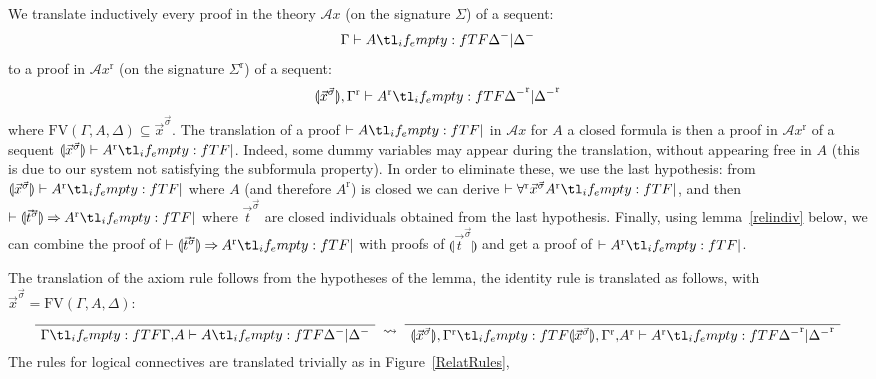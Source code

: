 \documentclass{CSML}
\newcommand*\ifpresent[3]{\tl_if_empty:fTF{#1}{#3}{#2}}
\newcommand*\AXM[1]{\AxiomC{$#1$}}
\newcommand*\UIM[1]{\UnaryInfC{$#1$}}
\newcommand*\DP\DisplayProof
\newcommand*\Entails{\mathrel{\vdash}}
\newcommand*\BarSep{\mathrel{|}}
\newcommand*\Sequent[3]{#1\Entails#2\ifpresent{#3}{\BarSep}{}#3}
\newcommand*\FV[1]{\text{FV}\left(#1\right)}
\newcommand*\SortA{\sigma}
\newcommand*\LogSortedTerm[2]{#1^{#2}}
\newcommand*\LogTermA{t}
\newcommand*\LogVarA{x}
\newcommand*\LogNeg[1]{{#1^-}}
\newcommand*\LogImp{\mathbin{\Rightarrow}}
\newcommand*\LogRel[1]{\llparenthesis#1\rrparenthesis}
\newcommand*\LogRelForm[1]{{#1^\mathrm{r}}}
\newcommand*\LogForallRel{\forall^\mathrm{r}}
\newcommand*\LogFormA{A}
\newcommand*\LogAxioms{\mathcal{A}x}
\newcommand*\LogRuleAxConcl[3]{\Sequent{#1\ifpresent{#1}{,}{}#3}{#3}{#2}}
\newcommand*\LogRuleAx[3]{\AXM{}\UIM{\LogRuleAxConcl{#1}{#2}{#3}}\DP}
\begin{document}
\proof
We translate inductively every proof in the theory $\LogAxioms$ (on the signature $\Sigma$) of a sequent:
$$\Sequent{\Gamma}{\LogFormA}{\LogNeg{\Delta}}$$
to a proof in $\LogRelForm{\LogAxioms}$ (on the signature $\LogRelForm{\Sigma}$) of a sequent:
$$\Sequent{\LogRel{\LogSortedTerm{\vec{\LogVarA}}{\vec{\SortA}}},\LogRelForm{\Gamma}}{\LogRelForm{\LogFormA}}{\LogRelForm{\LogNeg{\Delta}}}$$
where $\FV{\Gamma,\LogFormA,\Delta}\subseteq\LogSortedTerm{\vec{\LogVarA}}{\vec{\SortA}}$. The translation of a proof $\Sequent{}{\LogFormA}{}$ in $\LogAxioms$ for $\LogFormA$ a closed formula is then a proof in $\LogRelForm{\LogAxioms}$ of a sequent $\Sequent{\LogRel{\LogSortedTerm{\vec{\LogVarA}}{\vec{\SortA}}}}{\LogRelForm{\LogFormA}}{}$. Indeed, some dummy variables may appear during the translation, without appearing free in $\LogFormA$ (this is due to our system not satisfying the subformula property). In order to eliminate these, we use the last hypothesis: from $\Sequent{\LogRel{\LogSortedTerm{\vec{\LogVarA}}{\vec{\SortA}}}}{\LogRelForm{\LogFormA}}{}$ where $\LogFormA$ (and therefore $\LogRelForm{\LogFormA}$) is closed we can derive $\Sequent{}{\LogForallRel\LogSortedTerm{\vec{\LogVarA}}{\vec{\SortA}}\LogRelForm{\LogFormA}}{}$, and then $\Sequent{}{\LogRel{\LogSortedTerm{\vec{\LogTermA}}{\vec{\SortA}}}\LogImp\LogRelForm{\LogFormA}}{}$ where $\LogSortedTerm{\vec{\LogTermA}}{\vec{\SortA}}$ are closed individuals obtained from the last hypothesis. Finally, using lemma~\ref{relindiv} below, we can combine the proof of $\Sequent{}{\LogRel{\LogSortedTerm{\vec{\LogTermA}}{\vec{\SortA}}}\LogImp\LogRelForm{\LogFormA}}{}$ with proofs of $\LogRel{\LogSortedTerm{\vec{\LogTermA}}{\vec{\SortA}}}$ and get a proof of $\Sequent{}{\LogRelForm{\LogFormA}}{}$.\par
The translation of the axiom rule follows from the hypotheses of the lemma, the identity rule is translated as follows, with $\LogSortedTerm{\vec{\LogVarA}}{\vec{\SortA}}=\FV{\Gamma,\LogFormA,\Delta}$:
$$\LogRuleAx{\Gamma}{\LogNeg{\Delta}}{\LogFormA}\;\rightsquigarrow\;\LogRuleAx{\LogRel{\LogSortedTerm{\vec{\LogVarA}}{\vec{\SortA}}},\LogRelForm{\Gamma}}{\LogRelForm{\LogNeg{\Delta}}}{\LogRelForm{\LogFormA}}$$
The rules for logical connectives are translated trivially as in Figure~\ref{RelatRules},
\end{document}
